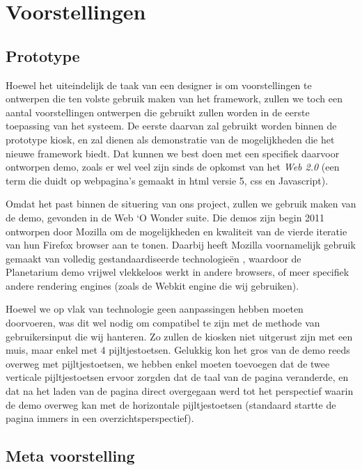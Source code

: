 \part{Voorstellingen}
\label{voorstellingen}

\chapter{Prototype}
\label{voorstellingen:prototype}

Hoewel het uiteindelijk de taak van een designer is om voorstellingen te ontwerpen die ten volste gebruik maken van het framework, zullen we toch een aantal voorstellingen ontwerpen die gebruikt zullen worden in de eerste toepassing van het systeem. De eerste daarvan zal gebruikt worden binnen de prototype kiosk, en zal dienen als demonstratie van de mogelijkheden die het nieuwe framework biedt. Dat kunnen we best doen met een specifiek daarvoor ontworpen demo, zoals er wel veel zijn sinds de opkomst van het \emph{Web 2.0} (een term die duidt op webpagina's gemaakt in \ac{html} versie 5, \ac{css} en Javascript).

Omdat het past binnen de situering van ons project, zullen we gebruik maken van de  demo, gevonden in de Web ‘O Wonder suite. Die demos zijn begin 2011 ontworpen door Mozilla om de mogelijkheden en kwaliteit van de vierde iteratie van hun Firefox browser aan te tonen. Daarbij heeft Mozilla voornamelijk gebruik gemaakt van volledig gestandaardiseerde technologieën \citep{webowonder}, waardoor de Planetarium demo vrijwel vlekkeloos werkt in andere browsers, of meer specifiek andere rendering engines (zoals de Webkit engine die wij gebruiken).

Hoewel we op vlak van technologie geen aanpassingen hebben moeten doorvoeren, was dit wel nodig om compatibel te zijn met de methode van gebruikersinput die wij hanteren. Zo zullen de kiosken niet uitgerust zijn met een muis, maar enkel met 4 pijltjestoetsen. Gelukkig kon het gros van de demo reeds overweg met pijltjestoetsen, we hebben enkel moeten toevoegen dat de twee verticale pijltjestoetsen ervoor zorgden dat de taal van de pagina veranderde, en dat na het laden van de pagina direct overgegaan werd tot het perspectief waarin de demo overweg kan met de horizontale pijltjestoetsen (standaard startte de pagina immers in een overzichtsperspectief).

\chapter{Meta voorstelling}
\label{voorstellingen:metavoorstelling}

